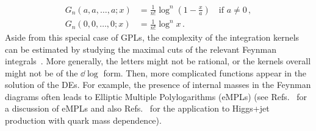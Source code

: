 \documentclass[main.tex]{subfiles}
\begin{document}
\begin{subequations}
   \begin{align}
    G_n(a, a, \ldots, a; x) &= 
        \frac{1}{n!}\log^n\left(1-\frac{x}{a}\right) \quad \text{if } a \neq 0\,, \label{eq:GPLtolognonzero} \\ 
    G_n(0, 0, \ldots, 0; x) &= 
        \frac{1}{n!}\log^n x \,. \label{eq:GPLtologzero}
   \end{align} 
\end{subequations}
Aside from this special case of GPLs, the complexity of the integration kernels can be estimated by studying the maximal cuts of the relevant Feynman integrals~\cite{Tancredi:2017onthemaxcut, Abreu:2020jxa, abreu2021twoloop}. More generally, the letters might not be rational, or the kernels overall might not be of the $\dd \log$ form. Then, more complicated functions appear in the solution of the DEs.  For example, the presence of internal masses in the Feynman diagrams often leads to Elliptic Multiple Polylogarithms (eMPLs) (see Refs.~ \cite{Broedel:2017kkb, Broedel:2017siw, Adams:2017ejb, Broedel:2018qkq, Adams:2018yfj, Walden:2020odh} for a discussion of eMPLs and also Refs.~\cite{Bonciani:2016qxi, Bonciani:2019jyb, Frellesvig:2019byn} for the application to Higgs+jet production with quark mass dependence). 
\end{document}
